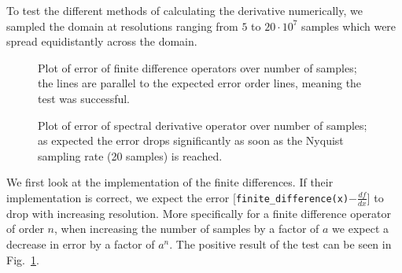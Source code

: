 To test the different methods of calculating the derivative numerically, we sampled the domain at resolutions ranging from $5$ to $20\cdot 10^7$ samples which were spread equidistantly across the domain.
\begin{figure}[!h]
    \caption{Plot of error of finite difference operators over number of samples;
    the lines are parallel to the expected error order lines, meaning the test was successful.}
    \label{fig:derivative_error}
\end{figure}
\begin{figure}[!h]
    \caption{Plot of error of spectral derivative operator over number of samples;
    as expected the error drops significantly as soon as the Nyquist sampling rate (20 samples) is reached.}
    \label{fig:fft_error}
\end{figure}
We first look at the implementation of the finite differences.
If their implementation is correct, we expect the error [\texttt{finite\_difference(x)}$-\frac{df}{dx}$] to drop with increasing resolution.
More specifically for a finite difference operator of order $n$, when increasing the number of samples by a factor of $a$ we expect a decrease in error by a factor of $a^{n}$.
The positive result of the test can be seen in Fig.~\ref{fig:derivative_error}.

